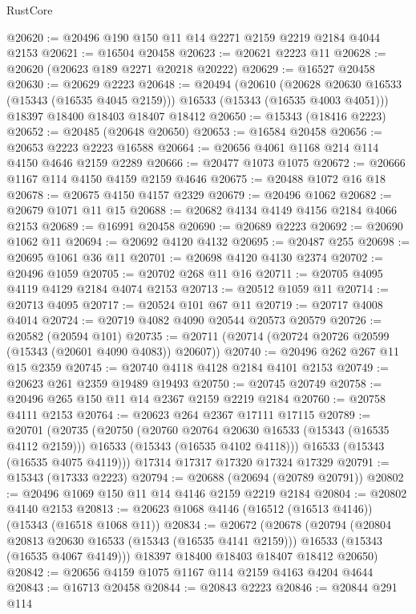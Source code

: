 \begin{lexlean}{RustCore}
\begin{coremodule}
@20620 := @20496 @190 @150 @11 @14 @2271 @2159 @2219 @2184 @4044 @2153
@20621 := @16504 @20458
@20623 := @20621 @2223 @11
@20628 := @20620 (@20623 @189 @2271 @20218 @20222)
@20629 := @16527 @20458
@20630 := @20629 @2223
@20648 := @20494
    (@20610
      (@20628 @20630 @16533 (@15343 (@16535 @4045 @2159)))
      @16533
      (@15343 (@16535 @4003 @4051)))
    @18397
    @18400
    @18403
    @18407
    @18412
@20650 := @15343 (@18416 @2223)
@20652 := @20485 (@20648 @20650)
@20653 := @16584 @20458
@20656 := @20653 @2223 @2223 @16588
@20664 := @20656 @4061 @1168 @214 @114 @4150 @4646 @2159 @2289
@20666 := @20477 @1073 @1075
@20672 := @20666 @1167 @114 @4150 @4159 @2159 @4646
@20675 := @20488 @1072 @16 @18
@20678 := @20675 @4150 @4157 @2329
@20679 := @20496 @1062
@20682 := @20679 @1071 @11 @15
@20688 := @20682 @4134 @4149 @4156 @2184 @4066 @2153
@20689 := @16991 @20458
@20690 := @20689 @2223
@20692 := @20690 @1062 @11
@20694 := @20692 @4120 @4132
@20695 := @20487 @255
@20698 := @20695 @1061 @36 @11
@20701 := @20698 @4120 @4130 @2374
@20702 := @20496 @1059
@20705 := @20702 @268 @11 @16
@20711 := @20705 @4095 @4119 @4129 @2184 @4074 @2153
@20713 := @20512 @1059 @11
@20714 := @20713 @4095
@20717 := @20524 @101 @67 @11
@20719 := @20717 @4008 @4014
@20724 := @20719 @4082 @4090 @20544 @20573 @20579
@20726 := @20582 (@20594 @101)
@20735 := @20711 (@20714 (@20724 @20726 @20599 (@15343 (@20601 @4090 @4083)) @20607))
@20740 := @20496 @262 @267 @11 @15 @2359
@20745 := @20740 @4118 @4128 @2184 @4101 @2153
@20749 := @20623 @261 @2359 @19489 @19493
@20750 := @20745 @20749
@20758 := @20496 @265 @150 @11 @14 @2367 @2159 @2219 @2184
@20760 := @20758 @4111 @2153
@20764 := @20623 @264 @2367 @17111 @17115
@20789 := @20701
    (@20735
      (@20750
        (@20760 @20764 @20630 @16533 (@15343 (@16535 @4112 @2159)))
        @16533
        (@15343 (@16535 @4102 @4118)))
      @16533
      (@15343 (@16535 @4075 @4119)))
    @17314
    @17317
    @17320
    @17324
    @17329
@20791 := @15343 (@17333 @2223)
@20794 := @20688 (@20694 (@20789 @20791))
@20802 := @20496 @1069 @150 @11 @14 @4146 @2159 @2219 @2184
@20804 := @20802 @4140 @2153
@20813 := @20623 @1068 @4146 (@16512 (@16513 @4146)) (@15343 (@16518 @1068 @11))
@20834 := @20672
    (@20678
      (@20794
        (@20804 @20813 @20630 @16533 (@15343 (@16535 @4141 @2159)))
        @16533
        (@15343 (@16535 @4067 @4149)))
      @18397
      @18400
      @18403
      @18407
      @18412
      @20650)
@20842 := @20656 @4159 @1075 @1167 @114 @2159 @4163 @4204 @4644
@20843 := @16713 @20458
@20844 := @20843 @2223
@20846 := @20844 @291 @114

\end{coremodule}
\end{lexlean}
